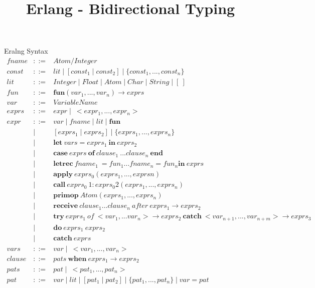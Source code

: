 \documentclass{amsart}
\title{Erlang - Bidirectional Typing}
\begin{document}
\maketitle


\begin{section}{Eralng Syntax}
\[
\begin{array}{lcl}
  fname & ::= & Atom / Integer \\
  const & ::= & lit \mid [ const_1 \mid const_2 ] \mid \{ const_1, . . ., const_n \} \\
  lit & ::= & Integer \mid Float \mid Atom \mid Char \mid String \mid [\ ] \\
  fun & ::= & \textbf{fun} (var_1,..., var_n) \to exprs \\
  var & ::= & VariableName \\
  exprs &  ::= & expr \mid\ < expr_1,..., expr_n > \\
  expr & ::=  & var \mid fname \mid lit \mid \textbf{fun} \\ 
  & \mid & [ exprs_1 \mid exprs_2 ] \mid \{ exprs_1,..., exprs_n \} \\ 
  & \mid & \textbf{let}\ vars = exprs_1\ \textbf{in}\ exprs_2 \\ 
  & \mid & \textbf{case}\ exprs\ \textbf{of}\ clause_1\ ... clause_n\ \textbf{end} \\ 
  & \mid & \textbf{letrec}\ fname_1\ = fun_1 ... fname_n = fun_n \textbf{in}\ exprs \\ 
  & \mid & \textbf{apply}\ exprs_0(exprs_1,..., exprsn) \\ 
  & \mid & \textbf{call}\ exprs_0\ 1:exprs_0 2(exprs_1,..., exprs_n) \\ 
  & \mid & \textbf{primop}\ Atom(exprs_1,..., exprs_n) \\ 
  & \mid & \textbf{receive}\ clause_1 ... clause_n\ after\ exprs_1 \to exprs_2 \\ 
  & \mid & \textbf{try}\ exprs_1\ of\ <var_1, ...var_n> \to exprs_2\ \textbf{catch}\ <var_{n+1},...,var_{n+m}> \to exprs_3 \\ 
  & \mid & \textbf{do}\ exprs_1\ exprs_2 \\ 
  & \mid & \textbf{catch}\ exprs \\
  vars & ::= & var \mid\ <var_1, . . ., var_n>\\
  clause & ::= & pats\ \textbf{when}\ exprs_1 \to exprs_2\\
  pats & ::= & pat \mid\ <pat_1, . . ., pat_n>\\
  pat & ::= & var \mid lit \mid [ pat_1 \mid pat_2 ] \mid \{pat_1, . . ., pat_n\} \mid var = pat \\
\end{array}
\]
\end{section}
\end{document}
